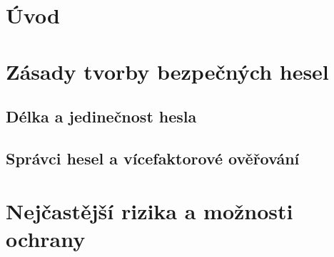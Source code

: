 \section{Úvod}


\section{Zásady tvorby bezpečných hesel}


\subsection{Délka a jedinečnost hesla}


\subsection{Správci hesel a vícefaktorové ověřování}


\section{Nejčastější rizika a možnosti ochrany}



